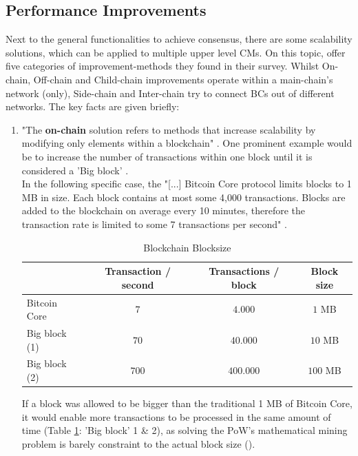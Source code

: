 \subsection{Performance Improvements}
\label{sec:PerformanceImprovements}
Next to the general functionalities to achieve consensus, there are some scalability solutions, which can be applied to multiple upper level \gls{CM}s.
On this topic, \citet[1204]{Kim.2018} offer five categories of improvement-methods they found in their survey.
Whilst On-chain, Off-chain and Child-chain improvements operate within a main-chain's network (only),
Side-chain and Inter-chain try to connect \gls{BC}s out of different networks.
The key facts are given briefly:

\begin{enumerate}
	\item "The \textbf{on-chain} solution refers to methods that increase scalability by modifying only elements within a blockchain" \cite[1204]{Kim.2018}.
	One prominent example would be to increase the number of transactions within one block until it is considered a 'Big block' \cite[1204]{Kim.2018}. \\
	In the following specific case, the "[...] Bitcoin Core protocol limits blocks to 1 MB in size.
	Each block contains at most some 4,000 transactions.
	Blocks are added to the blockchain	on average every 10 minutes,
	therefore the transaction rate is limited to some 7 transactions per second" \cite[1]{Goebel.2017}.
	\begin{table}[!b]
		\centering
		\begin{tabularx}{0.80\textwidth}{ l | c | c | c }
			& Transaction / second & Transactions / block & Block size \\ \hline
			Bitcoin Core & $7$ & $4.000$ & $1$ MB \\ \hline
			Big block (1) & $70$ & $40.000$ & $10$ MB \\ \hline
			Big block (2) & $700$ & $400.000$ & $100$ MB \\ \hline
		\end{tabularx}
		\caption{Blockchain Blocksize}
		\label{tbl:BlockSize}
	\end{table}
	If a block was allowed to be bigger than the traditional 1 MB of Bitcoin Core, it would enable more
	transactions to be processed in the same amount of time (Table \ref{tbl:BlockSize}: 'Big block' 1 \& 2),
	as solving the \gls{PoW}'s mathematical mining problem is barely constraint to the actual block size (\cite{Zhang.2018}).
		

\end{enumerate}
